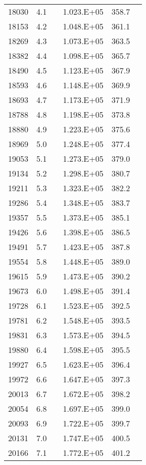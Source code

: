 \begin{longtable}{cccccc}
  18030 & 4.1 &  & 1.023.E+05 & 358.7 &  \\
  18153 & 4.2 &  & 1.048.E+05 & 361.1 &  \\
  18269 & 4.3 &  & 1.073.E+05 & 363.5 &  \\
  18382 & 4.4 &  & 1.098.E+05 & 365.7 &  \\
  18490 & 4.5 &  & 1.123.E+05 & 367.9 &  \\
  18593 & 4.6 &  & 1.148.E+05 & 369.9 &  \\
  18693 & 4.7 &  & 1.173.E+05 & 371.9 &  \\
  18788 & 4.8 &  & 1.198.E+05 & 373.8 &  \\
  18880 & 4.9 &  & 1.223.E+05 & 375.6 &  \\
  18969 & 5.0 &  & 1.248.E+05 & 377.4 &  \\
  19053 & 5.1 &  & 1.273.E+05 & 379.0 &  \\
  19134 & 5.2 &  & 1.298.E+05 & 380.7 &  \\
  19211 & 5.3 &  & 1.323.E+05 & 382.2 &  \\
  19286 & 5.4 &  & 1.348.E+05 & 383.7 &  \\
  19357 & 5.5 &  & 1.373.E+05 & 385.1 &  \\
  19426 & 5.6 &  & 1.398.E+05 & 386.5 &  \\
  19491 & 5.7 &  & 1.423.E+05 & 387.8 &  \\
  19554 & 5.8 &  & 1.448.E+05 & 389.0 &  \\
  19615 & 5.9 &  & 1.473.E+05 & 390.2 &  \\
  19673 & 6.0 &  & 1.498.E+05 & 391.4 &  \\
  19728 & 6.1 &  & 1.523.E+05 & 392.5 &  \\
  19781 & 6.2 &  & 1.548.E+05 & 393.5 &  \\
  19831 & 6.3 &  & 1.573.E+05 & 394.5 &  \\
  19880 & 6.4 &  & 1.598.E+05 & 395.5 &  \\
  19927 & 6.5 &  & 1.623.E+05 & 396.4 &  \\
  19972 & 6.6 &  & 1.647.E+05 & 397.3 &  \\
  20013 & 6.7 &  & 1.672.E+05 & 398.2 &  \\
  20054 & 6.8 &  & 1.697.E+05 & 399.0 &  \\
  20093 & 6.9 &  & 1.722.E+05 & 399.7 &  \\
  20131 & 7.0 &  & 1.747.E+05 & 400.5 &  \\
  20166 & 7.1 &  & 1.772.E+05 & 401.2 &  \\

\end{longtable}
